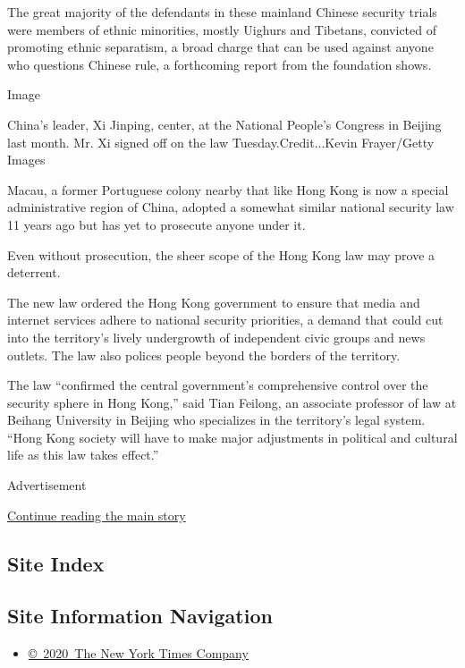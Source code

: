 The great majority of the defendants in these mainland Chinese security
trials were members of ethnic minorities, mostly Uighurs and Tibetans,
convicted of promoting ethnic separatism, a broad charge that can be
used against anyone who questions Chinese rule, a forthcoming report
from the foundation shows.

Image

China's leader, Xi Jinping, center, at the National People's Congress in
Beijing last month. Mr. Xi signed off on the law Tuesday.Credit...Kevin
Frayer/Getty Images

Macau, a former Portuguese colony nearby that like Hong Kong is now a
special administrative region of China, adopted a somewhat similar
national security law 11 years ago but has yet to prosecute anyone under
it.

Even without prosecution, the sheer scope of the Hong Kong law may prove
a deterrent.

The new law ordered the Hong Kong government to ensure that media and
internet services adhere to national security priorities, a demand that
could cut into the territory's lively undergrowth of independent civic
groups and news outlets. The law also polices people beyond the borders
of the territory.

The law ``confirmed the central government's comprehensive control over
the security sphere in Hong Kong,'' said Tian Feilong, an associate
professor of law at Beihang University in Beijing who specializes in the
territory's legal system. ``Hong Kong society will have to make major
adjustments in political and cultural life as this law takes effect.''

Advertisement

\protect\hyperlink{after-bottom}{Continue reading the main story}

\hypertarget{site-index}{%
\subsection{Site Index}\label{site-index}}

\hypertarget{site-information-navigation}{%
\subsection{Site Information
Navigation}\label{site-information-navigation}}

\begin{itemize}
\tightlist
\item
  \href{https://help.nytimes3xbfgragh.onion/hc/en-us/articles/115014792127-Copyright-notice}{©~2020~The
  New York Times Company}
\end{itemize}

